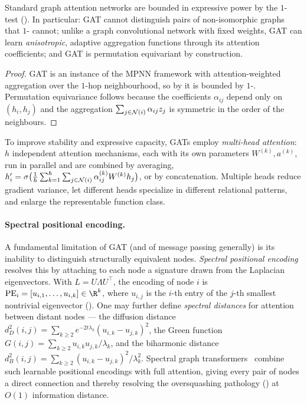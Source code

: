 \begin{proposition}
\label{prop:graphs:gat}
Standard graph attention networks are bounded in expressive power by the $1$-\WL{}
test (). In particular: GAT cannot distinguish pairs of
non-isomorphic graphs that $1$-\WL{} cannot; unlike a graph convolutional network
with fixed weights, GAT can learn \emph{anisotropic}, adaptive aggregation
functions through its attention coefficients; and GAT is permutation equivariant
by construction.
\end{proposition}

\begin{proof}
GAT is an instance of the MPNN framework with attention-weighted aggregation over
the $1$-hop neighbourhood, so by  it is bounded by
$1$-\WL. Permutation equivariance follows because the coefficients $\alpha_{ij}$
depend only on $(h_i, h_j)$ and the aggregation
$\sum_{j \in \mathcal{N}(i)} \alpha_{ij} z_j$ is symmetric in the order of the
neighbours.
\end{proof}

To improve stability and expressive capacity, GATs employ \emph{multi-head
attention}: $h$ independent attention mechanisms, each with its own parameters
$W^{(k)}, a^{(k)}$, run in parallel and are combined by averaging,
$h_i' = \sigma\big(\tfrac1h \sum_{k=1}^h \sum_{j \in \mathcal{N}(i)} \alpha_{ij}^{(k)}
W^{(k)} h_j\big)$, or by concatenation. Multiple heads reduce gradient variance,
let different heads specialize in different relational patterns, and enlarge the
representable function class.

\paragraph{Spectral positional encoding.}
A fundamental limitation of GAT (and of message passing generally) is its
inability to distinguish structurally equivalent nodes. \emph{Spectral positional
encoding} resolves this by attaching to each node a signature drawn from the
Laplacian eigenvectors. With $L = U\Lambda U^\top$, the encoding of node $i$ is
$\operatorname{PE}_i = [u_{i,1}, \dots, u_{i,k}] \in \R^k$, where $u_{i,j}$ is the
$i$-th entry of the $j$-th smallest nontrivial eigenvector
(). One may further define \emph{spectral distances} for
attention between distant nodes --- the diffusion distance
$d_D^2(i,j) = \sum_{k\ge2} e^{-2t\lambda_k}(u_{i,k} - u_{j,k})^2$, the Green
function $G(i,j) = \sum_{k\ge2} u_{i,k} u_{j,k}/\lambda_k$, and the biharmonic
distance $d_B^2(i,j) = \sum_{k\ge2}(u_{i,k} - u_{j,k})^2/\lambda_k^2$. Spectral
graph transformers~\citep{kreuzer2021spectral} combine such learnable positional
encodings with full attention, giving every pair of nodes a direct connection and
thereby resolving the oversquashing pathology ()
at $O(1)$ information distance.

